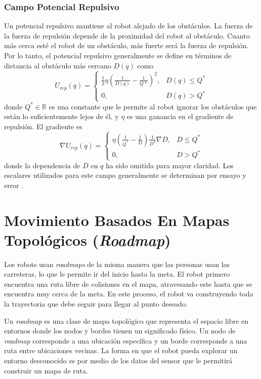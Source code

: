 \subsubsection{Campo Potencial Repulsivo}
Un potencial repulsivo mantiene al robot alejado de los obst\'aculos. La 
fuerza de la fuerza de repulsi\'on depende de la proximidad del robot al 
obst\'aculo. Cuanto m\'as cerca est\'e el robot de un obst\'aculo, m\'as 
fuerte ser\'a la fuerza de repulsi\'on. Por lo tanto, el potencial 
repulsivo generalmente se define en t\'erminos de distancia al obst\'aculo 
m\'as cercano $D(q)$ como 
\begin{equation}
U_{rep}(q) =
\begin{cases}
	\frac{1}{2}\eta(\frac{1}{D(q)} - \frac{1}{Q*})^2, & D(q)\leq Q^* \\
	0, & D(q) > Q^*
\end{cases}
\label{eq:pot_rep}
\end{equation}
donde $Q^* \in \mathbb R$ es una constante que le permite al robot ignorar 
los obst\'aculos que est\'an lo suficientemente lejos de \'el, y $\eta$ es 
una ganancia en el gradiente de repulsi\'on. El gradiente es 
\begin{equation}
\nabla U_{rep}(q) =
\begin{cases}
	\eta(\frac{1}{Q^*} - \frac{1}{D})\frac{1}{D^2} \nabla D, & D \leq Q^* \\
	0, & D > Q^*
\end{cases}
\label{eqn:gradient_rep}
\end{equation}
donde la dependencia de $D$ en $q$ ha sido omitida para mayor claridad. Los 
escalares utilizados para este campo generalmente se determinan por ensayo 
y error \cite{choset2005principles}.

\section{Movimiento Basados En Mapas Topol\'ogicos (\textit{Roadmap})}

Los robots usan \textit{roadmaps} de la misma manera que las personas usan 
las carreteras, lo que le permite ir del inicio hasta la meta. El robot 
primero encuentra una ruta libre de colisiones en el mapa, atravesando este 
hasta que se encuentra muy cerca de la meta. En este proceso, el robot va 
construyendo toda la trayectoria que debe seguir para llegar al punto deseado. 

Un \textit{roadmap} es una clase de mapa topol\'ogico que representa el 
espacio libre en entornos \cite{choset2005RoadMap} donde los nodos y bordes 
tienen un significado f\'isico. Un nodo de \textit{roadmap} corresponde a 
una ubicaci\'on espec\'ifica y un borde corresponde a una ruta entre ubicaciones 
vecinas. La forma en que el robot pueda explorar un entorno desconocido es por 
medio de los datos del sensor que le permitir\'a construir un mapa de ruta.

